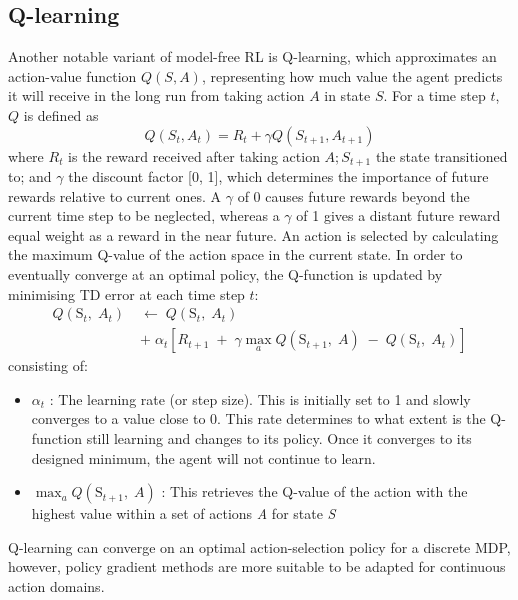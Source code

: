 \documentclass[10pt,journal,compsoc]{IEEEtran}
\begin{document}
\subsection{Q-learning}
Another notable variant of model-free RL is Q-learning\cite{watkins1989learning}, which approximates an action-value function $Q(S, A)$, representing how much value the agent predicts it will receive in the long run from taking action $A$ in state $S$. For a time step $t$, $Q$ is defined\cite{qlearning} as \[Q(S_t, A_t) = R_t + \gamma Q(S_{t+1}, A_{t+1})\] where $R_t$ is the reward received after taking action $A; S_{t+1}$ the state transitioned to; and $\gamma$ the discount factor [0, 1], which determines the importance of future rewards relative to current ones.  A \(\gamma\) of 0 causes future rewards beyond the current time step to be neglected, whereas a \(\gamma\) of 1 gives a distant future reward equal weight as a reward in the near future. An action is selected by calculating the maximum Q-value of the action space in the current state. In order to eventually converge at an optimal policy, the Q-function is updated by minimising TD error at each time step $t$:
\begin{align*}
Q\left( \mbox{S}_{t},\; A_{t} \right)\; &\leftarrow\;Q\left( \mbox{S}_{t},\; A_{t} \right)\;\\ 
&+\; \alpha_{t}\left[ R_{t+1}\; +\; \gamma \max _{a}Q\left( \mbox{S}_{t+1},\; A \right)\; -\; Q\left( \mbox{S}_{t},\; A_{t} \right) \right]
\end{align*}
\indent
consisting of:
\begin{itemize}
\item \({{\alpha}}_{{t}}\) : The learning rate (or step size). This is initially set to 1 and slowly converges to a value close to 0. This rate determines to what extent is the Q-function still learning and changes to its policy. Once it converges to its designed minimum, the agent will not continue to learn.
\item \(\max _{a}Q\left( \mbox{S}_{t+1},\; A \right)\) : This retrieves the Q-value of the action with the highest value within a set of actions \textit{A} for state \textit{S}
\end{itemize}


Q-learning can converge on an optimal action-selection policy for a discrete MDP, however, policy gradient methods are more suitable to be adapted for continuous action domains.
\end{document}

